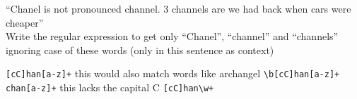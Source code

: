 \documentclass[theme=sleek, randomorder, hidesidemenu]{webquiz}
\begin{document}
\begin{question}
  ``Chanel is not pronounced channel. 3 channels are we had back when cars were cheaper''\\
  Write the regular expression to get only ``Chanel'', ``channel'' and ``channels'' ignoring case of these words (only in this sentence as context)

  \begin{choice}[columns=2]
    \incorrect \verb|[cC]han[a-z]+|
    \feedback this would also match words like archangel
    \correct \verb|\b[cC]han[a-z]+|
    \incorrect \verb|chan[a-z]+| \feedback this lacks the capital C
    \incorrect \verb|[cC]han\w+|

  \end{choice}


\end{question}
\end{document}
